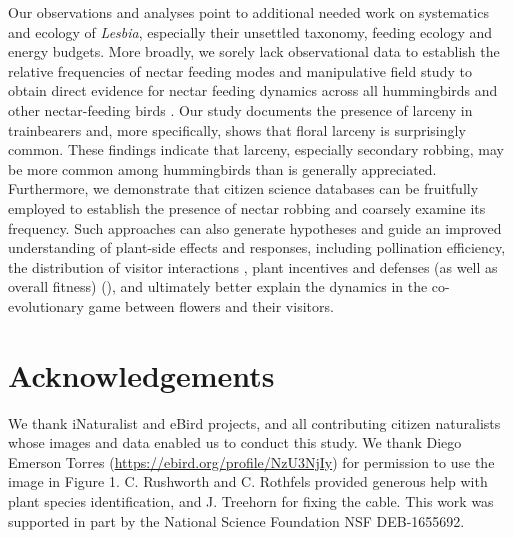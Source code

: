 \documentclass[fleqn,10pt,lineno]{wlpeerj}
\begin{document}
Our observations and analyses point to additional needed work on systematics and ecology of \textit{Lesbia}, especially their unsettled taxonomy, feeding ecology and energy budgets.  %
More broadly, we sorely lack observational data to establish the relative frequencies of nectar feeding modes and manipulative field study to obtain direct evidence for nectar feeding dynamics across all hummingbirds and other nectar-feeding birds \citep{irwin2010}.
Our study documents the presence of larceny in trainbearers and, more specifically, shows that floral larceny is surprisingly common. 
These findings indicate that larceny, especially secondary robbing, may be more common among hummingbirds than is generally appreciated.
Furthermore, we demonstrate that citizen science databases can be fruitfully employed to establish the presence of nectar robbing and coarsely examine its frequency.
Such approaches can also generate hypotheses and guide an improved understanding of plant-side effects and responses, including pollination efficiency, the distribution of visitor interactions \citep{maloof2000,arizmendi2001}, plant incentives and defenses (as well as overall fitness) (\citealt{pelayo2011}), and ultimately better explain the dynamics in the co-evolutionary game between flowers and their visitors.

\section*{Acknowledgements}

We thank iNaturalist and eBird projects, and all contributing citizen naturalists whose images and data enabled us to conduct this study. We thank Diego Emerson Torres (\href{https://ebird.org/profile/NzU3NjIy}{https://ebird.org/profile/NzU3NjIy}) for permission to use the image in Figure 1. 
C. Rushworth and C. Rothfels provided generous help with plant species identification, and
J. Treehorn for fixing the cable.
This work was supported in part by the National Science Foundation NSF DEB-1655692.

\clearpage




\end{document}
